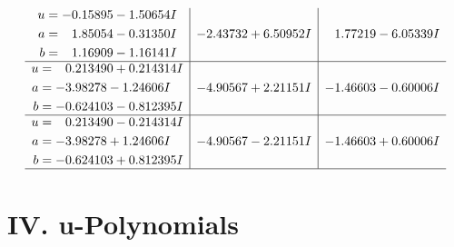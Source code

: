 \documentclass[1p]{elsarticle_modified}
\theoremstyle{definition}
\begin{document}
$$\begin{array}{c|c|c}
\begin{aligned}
u &= -0.15895 - 1.50654 I \\
a &= \phantom{-}1.85054 - 0.31350 I \\
b &= \phantom{-}1.16909 - 1.16141 I\end{aligned}
 & -2.43732 + 6.50952 I & \phantom{-}1.77219 - 6.05339 I \\ \hline\begin{aligned}
u &= \phantom{-}0.213490 + 0.214314 I \\
a &= -3.98278 - 1.24606 I \\
b &= -0.624103 - 0.812395 I\end{aligned}
 & -4.90567 + 2.21151 I & -1.46603 - 0.60006 I \\ \hline\begin{aligned}
u &= \phantom{-}0.213490 - 0.214314 I \\
a &= -3.98278 + 1.24606 I \\
b &= -0.624103 + 0.812395 I\end{aligned}
 & -4.90567 - 2.21151 I & -1.46603 + 0.60006 I\\
 \hline 
 \end{array}$$\newpage
\newpage\renewcommand{\arraystretch}{1}
\centering \section*{ IV. u-Polynomials}
\end{document}
